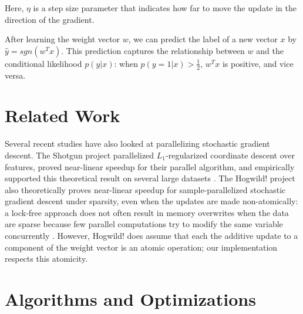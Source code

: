 \documentclass{article}
\begin{document}
Here, $\eta$ is a step size parameter that indicates how far to move the update in the direction of the gradient.

After learning the weight vector $w$, we can predict the label of a new vector $x$ by $\hat{y} = sgn(w^Tx)$. This prediction captures the relationship between $w$ and the conditional likelihood $p(y|x)$: when $p(y = 1|x) > \frac{1}{2}$, $w^Tx$ is positive, and vice versa.

\section{Related Work}
Several recent studies have also looked at parallelizing stochastic gradient descent. The Shotgun project parallelized $L_1$-regularized coordinate descent over features, proved near-linear speedup for their parallel algorithm, and empirically supported this theoretical result on several large datasets \cite{shotgun2011}. The Hogwild! project also theoretically proves near-linear speedup for sample-parallelized stochastic gradient descent under sparsity, even when the updates are made non-atomically: a lock-free approach does not often result in memory overwrites when the data are sparse because few parallel computations try to modify the same variable concurrently \cite{hogwild2011}. However, Hogwild! does assume that each the additive update to a component of the weight vector is an atomic operation; our implementation respects this atomicity. %

\section{Algorithms and Optimizations}
\end{document}
